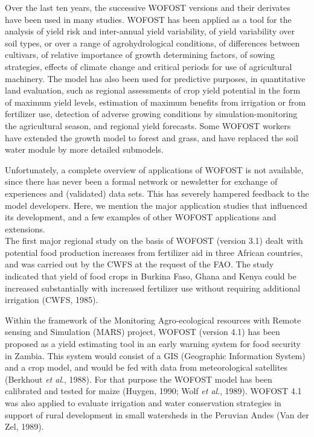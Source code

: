 Over the last ten years, the successive WOFOST versions and their derivates have been
used in many studies. WOFOST has been applied as a tool for the analysis of yield risk
and inter-annual yield variability, of yield variability over soil types, or over a range of
agrohydrological conditions, of differences between cultivars, of relative importance of
growth determining factors, of sowing strategies, effects of climate change and critical
periods for use of agricultural machinery. The model has also been used for predictive
pur\-poses, in quantitative land evaluation, such as regional assessments of crop yield
potential in the form of maximum yield levels, estimation of maximum benefits from
irrigation or from fertilizer use, detection of adverse growing condi\-tions by simulation-monitoring the agricultural season, and regional yield forecasts. Some WOFOST workers
have extended the growth model to forest and grass, and have replaced the soil water
module by more detailed submodels.

Unfortunately, a complete overview of applications of WOFOST is not available, since
there has never been a formal network or newsletter for exchange of experiences and
(validat\-ed) data sets. This has severely hampered feedback to the model devel\-opers. Here,
we mention the major application studies that influenced its development, and a few
examples of other WOFOST applications and extensions.\\
 The first major regional study on the basis of WOFOST (version 3.1) dealt with potential
food production increases from fertilizer aid in three African countries, and was carried
out by the CWFS at the request of the FAO. The study indicated that yield of food crops
in Burkina Faso, Ghana and Kenya could be increased substantially with increased
fertilizer use without requiring additional irrigation (CWFS, 1985).

\bigskip
Within the framework of the Monitoring Agro-ecological {\nobreak}resources with Remote sensing
and Simulation (MARS) project, WOFOST (version 4.1) has been proposed as a yield
estimating tool in an early warning system for food security in Zambia. This system
would consist of a GIS (Geographic Information System) and a crop model, and would be
fed with data from meteorological satellites (Berkhout {\it et al\/}., 1988). For that purpose the
WOFOST model has been calibrated and tested for maize (Huygen, 1990; Wolf {\it et al\/}.,
1989). WOFOST 4.1 was also applied to evaluate irrigation and water conservation strat\-egies in support of rural development in small watersheds in the Peruvian Andes (Van der
Zel, 1989).

